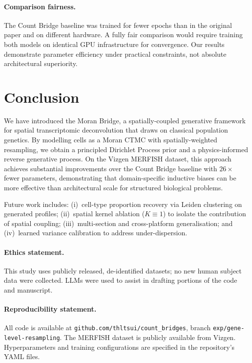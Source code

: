 \documentclass[11pt]{article}
\begin{document}
\paragraph{Comparison fairness.}
The Count Bridge baseline was trained for fewer epochs than in the original paper and on different hardware. A fully fair comparison would require training both models on identical GPU infrastructure for convergence. Our results demonstrate parameter efficiency under practical constraints, not absolute architectural superiority.

\section{Conclusion}
\label{sec:conclusion}

We have introduced the Moran Bridge, a spatially-coupled generative framework for spatial transcriptomic deconvolution that draws on classical population genetics. By modelling cells as a Moran CTMC with spatially-weighted resampling, we obtain a principled Dirichlet Process prior and a physics-informed reverse generative process. On the Vizgen MERFISH dataset, this approach achieves substantial improvements over the Count Bridge baseline with $26\times$ fewer parameters, demonstrating that domain-specific inductive biases can be more effective than architectural scale for structured biological problems.

Future work includes: (i)~cell-type proportion recovery via Leiden clustering on generated profiles; (ii)~spatial kernel ablation ($K \equiv 1$) to isolate the contribution of spatial coupling; (iii)~multi-section and cross-platform generalisation; and (iv)~learned variance calibration to address under-dispersion.

\paragraph{Ethics statement.}
This study uses publicly released, de-identified datasets; no new human subject data were collected. LLMs were used to assist in drafting portions of the code and manuscript.

\paragraph{Reproducibility statement.}
All code is available at \texttt{github.com/thltsui/count\_bridges}, branch \texttt{exp/gene-level-resampling}. The MERFISH dataset is publicly available from Vizgen. Hyperparameters and training configurations are specified in the repository's YAML files.



\end{document}
